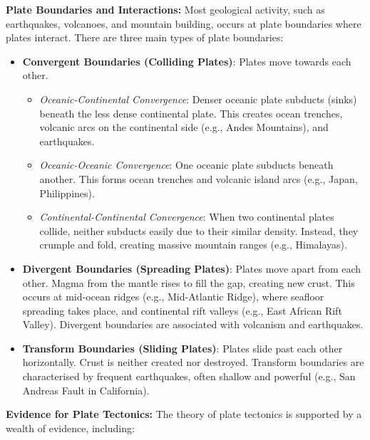 \textbf{Plate Boundaries and Interactions:}  Most geological activity, such as earthquakes, volcanoes, and mountain building, occurs at plate boundaries where plates interact. There are three main types of plate boundaries:

\begin{itemize}
    \item \textbf{Convergent Boundaries (Colliding Plates)}: Plates move towards each other.
        \begin{itemize}
            \item \textit{Oceanic-Continental Convergence}: Denser oceanic plate subducts (sinks) beneath the less dense continental plate. This creates ocean trenches, volcanic arcs on the continental side (e.g., Andes Mountains), and earthquakes.
            \item \textit{Oceanic-Oceanic Convergence}: One oceanic plate subducts beneath another. This forms ocean trenches and volcanic island arcs (e.g., Japan, Philippines).
            \item \textit{Continental-Continental Convergence}:  When two continental plates collide, neither subducts easily due to their similar density.  Instead, they crumple and fold, creating massive mountain ranges (e.g., Himalayas).
        \end{itemize}
    \item \textbf{Divergent Boundaries (Spreading Plates)}: Plates move apart from each other.  Magma from the mantle rises to fill the gap, creating new crust.  This occurs at mid-ocean ridges (e.g., Mid-Atlantic Ridge), where seafloor spreading takes place, and continental rift valleys (e.g., East African Rift Valley). Divergent boundaries are associated with volcanism and earthquakes.
    \item \textbf{Transform Boundaries (Sliding Plates)}: Plates slide past each other horizontally.  Crust is neither created nor destroyed. Transform boundaries are characterised by frequent earthquakes, often shallow and powerful (e.g., San Andreas Fault in California).
\end{itemize}

\textbf{Evidence for Plate Tectonics:} The theory of plate tectonics is supported by a wealth of evidence, including:

